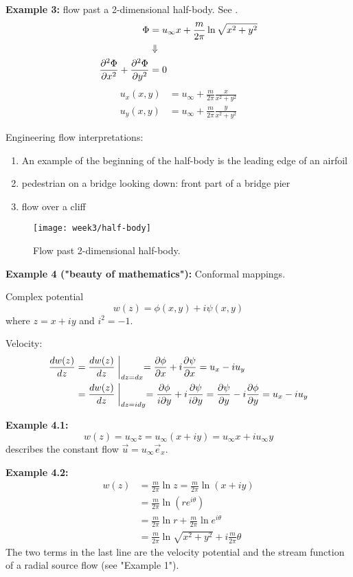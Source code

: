 \textbf{Example 3:} flow past a 2-dimensional half-body. See .
\begin{align}
\Phi &= u_\infty x + \frac{m}{2\pi}\ln\sqrt{x^2+y^2}\\
&\Downarrow\notag\\
\frac{\partial^2 \Phi}{\partial x^2}+\frac{\partial^2 \Phi}{\partial y^2} &= 0
\end{align}
\begin{align}
u_x(x,y) &= u_\infty + \frac{m}{2\pi}\frac{x}{x^2+y^2}\\
u_y(x,y) &= u_\infty + \frac{m}{2\pi}\frac{y}{x^2+y^2}
\end{align}

Engineering flow interpretations:
\begin{enumerate}
\item An example of the beginning of the half-body is the leading edge of an airfoil
\item pedestrian on a bridge looking down: front part of a bridge pier
\item flow over a cliff
\end{enumerate}

\begin{figure}[!h]
    \centering
    \texttt{[image: week3/half-body]}\\
    \caption{Flow past 2-dimensional half-body.}
    \label{fig:half-body}
\end{figure}

\textbf{Example 4 ("beauty of mathematics"):} Conformal mappings.

Complex potential
\begin{equation}
w(z) = \phi(x,y)+i\psi(x,y)
\end{equation}
where $z=x+iy$ and $i^2=-1$.

Velocity:
\begin{align}
\frac{d w(z)}{d z} &= \frac{d w(z)}{d z}\biggm\vert_{dz=dx} = \frac{\partial \phi}{\partial x}+i\frac{\partial \psi}{\partial x} = u_x-iu_y \\
&= \frac{d w(z)}{d z}\biggm\vert_{dz=idy} = \frac{\partial\phi}{i\partial y}+i\frac{\partial\psi}{i\partial y} = \frac{\partial \psi}{\partial y}-i\frac{\partial \phi}{\partial y} = u_x-iu_y
\end{align}

\textbf{Example 4.1:}
\begin{equation}
w(z)=u_\infty z = u_\infty(x+iy) = u_\infty x + iu_\infty y
\end{equation}
describes the constant flow $\vec{u}=u_\infty \vec{e}_x$.

\textbf{Example 4.2:}
\begin{align}
w(z) &= \frac{m}{2\pi}\ln z = \frac{m}{2\pi} \ln(x+iy)\\
&= \frac{m}{2\pi}\ln\left(re^{i\theta}\right)\\
&= \frac{m}{2\pi}\ln r +\frac{m}{2\pi}\ln e^{i\theta}\\
&= \frac{m}{2\pi}\ln\sqrt{x^2+y^2} + i\frac{m}{2\pi}\theta
\end{align}
The two terms in the last line are the velocity potential and the stream function of a radial source flow (see "Example 1").

